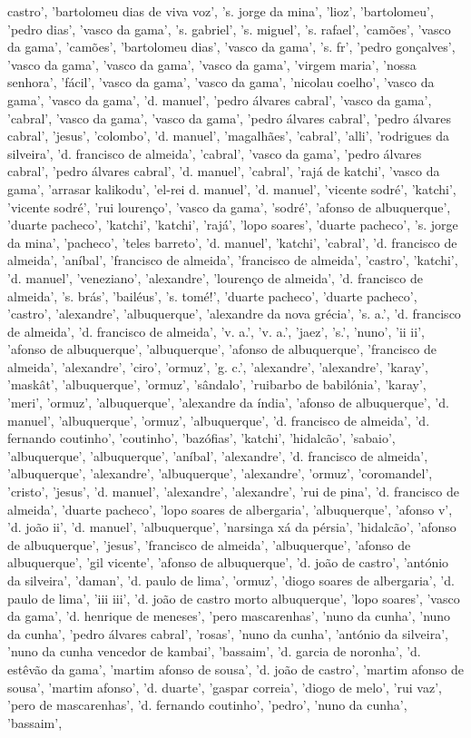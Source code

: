 \documentclass{article}
\begin{document}
\begin{itemize}
castro', 'bartolomeu dias de viva voz', 's. jorge da mina', 'lioz', 'bartolomeu', 'pedro dias', 'vasco da gama', 's. gabriel', 's. miguel', 's. rafael', 'camões', 'vasco da gama', 'camões', 'bartolomeu dias', 'vasco da gama', 's. fr', 'pedro gonçalves', 'vasco da gama', 'vasco da gama', 'vasco da gama', 'virgem maria', 'nossa senhora', 'fácil', 'vasco da gama', 'vasco da gama', 'nicolau coelho', 'vasco da gama', 'vasco da gama', 'd. manuel', 'pedro álvares cabral', 'vasco da gama', 'cabral', 'vasco da gama', 'vasco da gama', 'pedro álvares cabral', 'pedro álvares cabral', 'jesus', 'colombo', 'd. manuel', 'magalhães', 'cabral', 'alli', 'rodrigues da silveira', 'd. francisco de almeida', 'cabral', 'vasco da gama', 'pedro álvares cabral', 'pedro álvares cabral', 'd. manuel', 'cabral', 'rajá de katchi', 'vasco da gama', 'arrasar kalikodu', 'el-rei d. manuel', 'd. manuel', 'vicente sodré', 'katchi', 'vicente sodré', 'rui lourenço', 'vasco da gama', 'sodré', 'afonso de albuquerque', 'duarte pacheco', 'katchi', 'katchi', 'rajá', 'lopo soares', 'duarte pacheco', 's. jorge da mina', 'pacheco', 'teles barreto', 'd. manuel', 'katchi', 'cabral', 'd. francisco de almeida', 'aníbal', 'francisco de almeida', 'francisco de almeida', 'castro', 'katchi', 'd. manuel', 'veneziano', 'alexandre', 'lourenço de almeida', 'd. francisco de almeida', 's. brás', 'bailéus', 's. tomé!', 'duarte pacheco', 'duarte pacheco', 'castro', 'alexandre', 'albuquerque', 'alexandre da nova grécia', 's. a.', 'd. francisco de almeida', 'd. francisco de almeida', 'v. a.', 'v. a.', 'jaez', 's.', 'nuno', 'ii ii', 'afonso de albuquerque', 'albuquerque', 'afonso de albuquerque', 'francisco de almeida', 'alexandre', 'ciro', 'ormuz', 'g. c.', 'alexandre', 'alexandre', 'karay', 'maskât', 'albuquerque', 'ormuz', 'sândalo', 'ruibarbo de babilónia', 'karay', 'meri', 'ormuz', 'albuquerque', 'alexandre da índia', 'afonso de albuquerque', 'd. manuel', 'albuquerque', 'ormuz', 'albuquerque', 'd. francisco de almeida', 'd. fernando coutinho', 'coutinho', 'bazófias', 'katchi', 'hidalcão', 'sabaio', 'albuquerque', 'albuquerque', 'aníbal', 'alexandre', 'd. francisco de almeida', 'albuquerque', 'alexandre', 'albuquerque', 'alexandre', 'ormuz', 'coromandel', 'cristo', 'jesus', 'd. manuel', 'alexandre', 'alexandre', 'rui de pina', 'd. francisco de almeida', 'duarte pacheco', 'lopo soares de albergaria', 'albuquerque', 'afonso v', 'd. joão ii', 'd. manuel', 'albuquerque', 'narsinga xá da pérsia', 'hidalcão', 'afonso de albuquerque', 'jesus', 'francisco de almeida', 'albuquerque', 'afonso de albuquerque', 'gil vicente', 'afonso de albuquerque', 'd. joão de castro', 'antónio da silveira', 'daman', 'd. paulo de lima', 'ormuz', 'diogo soares de albergaria', 'd. paulo de lima', 'iii iii', 'd. joão de castro morto albuquerque', 'lopo soares', 'vasco da gama', 'd. henrique de meneses', 'pero mascarenhas', 'nuno da cunha', 'nuno da cunha', 'pedro álvares cabral', 'rosas', 'nuno da cunha', 'antónio da silveira', 'nuno da cunha vencedor de kambai', 'bassaim', 'd. garcia de noronha', 'd. estêvão da gama', 'martim afonso de sousa', 'd. joão de castro', 'martim afonso de sousa', 'martim afonso', 'd. duarte', 'gaspar correia', 'diogo de melo', 'rui vaz', 'pero de mascarenhas', 'd. fernando coutinho', 'pedro', 'nuno da cunha', 'bassaim', 
\end{itemize}
\end{document}
